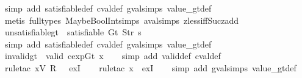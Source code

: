 \begin{isabellebody}
%
\isatagproof
{}\isamarkupfalse%
\ {\isacharparenleft}simp\ add{\isacharcolon}\ satisfiable{\isacharunderscore}def\ cval{\isacharunderscore}def\ gval{\isachardot}simps\ value_gt{\isacharunderscore}def{\isacharparenright}\isanewline
\ \ \isamarkupfalse%
\ {\isacharparenleft}metis\ {\isacharparenleft}full{\isacharunderscore}types{\isacharparenright}\ MaybeBoolInt{\isachardot}simps{\isacharparenleft}{}{\isacharparenright}\ aval{\isachardot}simps{\isacharparenleft}{}{\isacharparenright}\ zless{\isacharunderscore}iff{\isacharunderscore}Suc{\isacharunderscore}zadd{\isacharparenright}%
\endisatagproof
{\isafoldproof}%
%
\isadelimproof
\isanewline
%
\endisadelimproof
\isanewline
{}\isamarkupfalse%
\ unsatisfiable{\isacharunderscore}gt{\isacharcolon}\ {\isachardoublequoteopen}{\isasymnot}\ satisfiable\ {\isacharparenleft}Gt\ {\isacharparenleft}Str\ s{\isacharparenright}{\isacharparenright}{\isachardoublequoteclose}\isanewline
%
\isadelimproof
\ \ %
\endisadelimproof
%
\isatagproof
{}\isamarkupfalse%
\ {\isacharparenleft}simp\ add{\isacharcolon}\ satisfiable{\isacharunderscore}def\ cval{\isacharunderscore}def\ gval{\isachardot}simps\ value_gt{\isacharunderscore}def{\isacharparenright}%
\endisatagproof
{\isafoldproof}%
%
\isadelimproof
\isanewline
%
\endisadelimproof
\isanewline
{}\isamarkupfalse%
\ invalid{\isacharunderscore}gt{\isacharcolon}\ {\isachardoublequoteopen}{\isasymnot}\ valid\ {\isacharparenleft}cexp{\isachardot}Gt\ x{}{\isacharparenright}{\isachardoublequoteclose}\isanewline
%
\isadelimproof
\ \ %
\endisadelimproof
%
\isatagproof
{}\isamarkupfalse%
\ {\isacharparenleft}simp\ add{\isacharcolon}\ valid{\isacharunderscore}def\ cval{\isacharunderscore}def{\isacharparenright}\isanewline
\ \ \isamarkupfalse%
\ {\isacharparenleft}rule{\isacharunderscore}tac\ x{\isacharequal}{\isachardoublequoteopen}V\ {\isacharparenleft}R\ {}{\isacharparenright}{\isachardoublequoteclose}\ \ exI{\isacharparenright}\isanewline
\ \ \isamarkupfalse%
\ {\isacharparenleft}rule{\isacharunderscore}tac\ x{\isacharequal}{\isachardoublequoteopen}{\isacharless}{\isachargreater}{\isachardoublequoteclose}\ \ exI{\isacharparenright}\isanewline
\ \ \isamarkupfalse%
\ {\isacharparenleft}simp\ add{\isacharcolon}\ gval{\isachardot}simps\ value_gt{\isacharunderscore}def{\isacharparenright}%
\endisatagproof
{\isafoldproof}%
%
\isadelimproof
\isanewline
%
\endisadelimproof
\isanewline

\end{isabellebody}
